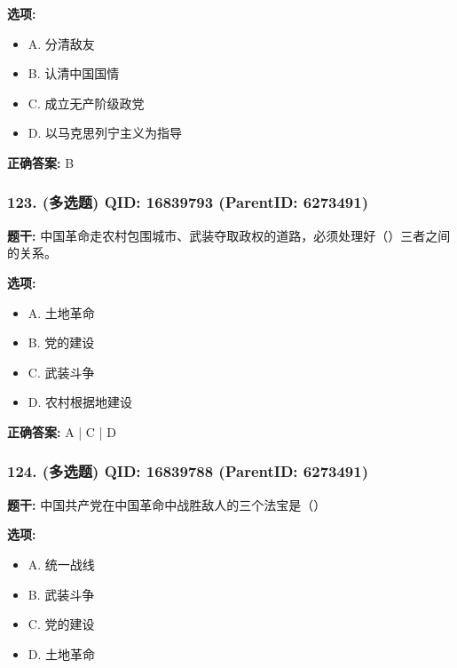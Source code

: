 \documentclass[12pt,UTF8]{ctexart}
\begin{document}
\textbf{选项:}
\begin{itemize}[leftmargin=*]

  \item A. 分清敌友

  \item B. 认清中国国情

  \item C. 成立无产阶级政党

  \item D. 以马克思列宁主义为指导

\end{itemize}

\textbf{正确答案:}
B

\vspace{0.3em}\hrulefill\vspace{0.7em}

\subsubsection*{123. (多选题) \small QID: 16839793 (ParentID: 6273491)}

\textbf{题干:}
中国革命走农村包围城市、武装夺取政权的道路，必须处理好（）三者之间的关系。



\textbf{选项:}
\begin{itemize}[leftmargin=*]

  \item A. 土地革命

  \item B. 党的建设

  \item C. 武装斗争

  \item D. 农村根据地建设

\end{itemize}

\textbf{正确答案:}
A | C | D

\vspace{0.3em}\hrulefill\vspace{0.7em}

\subsubsection*{124. (多选题) \small QID: 16839788 (ParentID: 6273491)}

\textbf{题干:}
中国共产党在中国革命中战胜敌人的三个法宝是（）



\textbf{选项:}
\begin{itemize}[leftmargin=*]

  \item A. 统一战线

  \item B. 武装斗争

  \item C. 党的建设

  \item D. 土地革命

\end{itemize}
\end{document}
